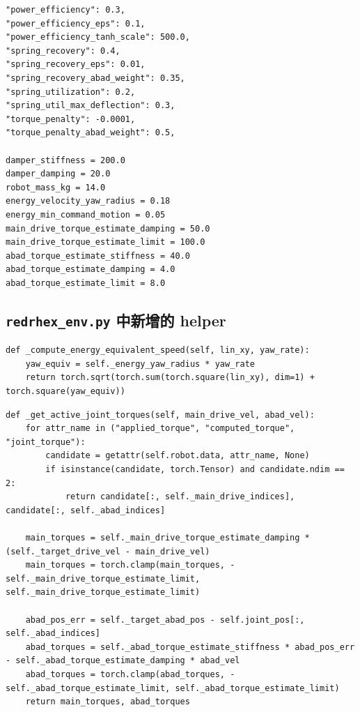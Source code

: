 \documentclass[12pt,a4paper,UTF8]{ctexart}
\begin{document}
\begin{lstlisting}[style=pythonstyle,caption={節能 reward 權重與物理常數}]
"power_efficiency": 0.3,
"power_efficiency_eps": 0.1,
"power_efficiency_tanh_scale": 500.0,
"spring_recovery": 0.4,
"spring_recovery_eps": 0.01,
"spring_recovery_abad_weight": 0.35,
"spring_utilization": 0.2,
"spring_util_max_deflection": 0.3,
"torque_penalty": -0.0001,
"torque_penalty_abad_weight": 0.5,

damper_stiffness = 200.0
damper_damping = 20.0
robot_mass_kg = 14.0
energy_velocity_yaw_radius = 0.18
energy_min_command_motion = 0.05
main_drive_torque_estimate_damping = 50.0
main_drive_torque_estimate_limit = 100.0
abad_torque_estimate_stiffness = 40.0
abad_torque_estimate_damping = 4.0
abad_torque_estimate_limit = 8.0
\end{lstlisting}

\subsection{\texttt{redrhex\_env.py} 中新增的 helper}

\begin{lstlisting}[style=pythonstyle,caption={等效運動速度 helper}]
def _compute_energy_equivalent_speed(self, lin_xy, yaw_rate):
    yaw_equiv = self._energy_yaw_radius * yaw_rate
    return torch.sqrt(torch.sum(torch.square(lin_xy), dim=1) + torch.square(yaw_equiv))
\end{lstlisting}

\begin{lstlisting}[style=pythonstyle,caption={主動關節力矩讀取與 fallback}]
def _get_active_joint_torques(self, main_drive_vel, abad_vel):
    for attr_name in ("applied_torque", "computed_torque", "joint_torque"):
        candidate = getattr(self.robot.data, attr_name, None)
        if isinstance(candidate, torch.Tensor) and candidate.ndim == 2:
            return candidate[:, self._main_drive_indices], candidate[:, self._abad_indices]

    main_torques = self._main_drive_torque_estimate_damping * (self._target_drive_vel - main_drive_vel)
    main_torques = torch.clamp(main_torques, -self._main_drive_torque_estimate_limit, self._main_drive_torque_estimate_limit)

    abad_pos_err = self._target_abad_pos - self.joint_pos[:, self._abad_indices]
    abad_torques = self._abad_torque_estimate_stiffness * abad_pos_err - self._abad_torque_estimate_damping * abad_vel
    abad_torques = torch.clamp(abad_torques, -self._abad_torque_estimate_limit, self._abad_torque_estimate_limit)
    return main_torques, abad_torques
\end{lstlisting}
\end{document}
